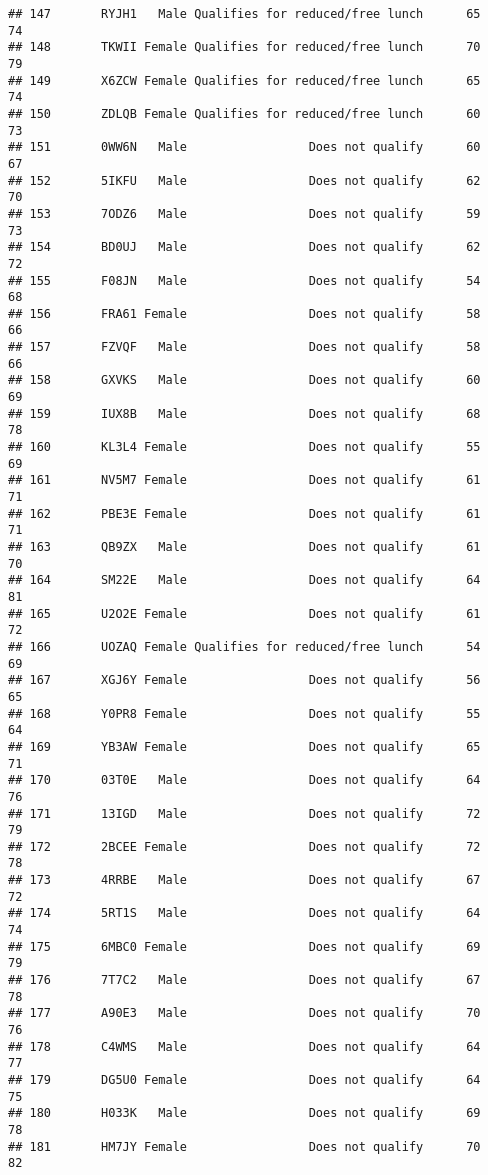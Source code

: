 \documentclass[
]{article}
\begin{document}
\begin{verbatim}
## 147       RYJH1   Male Qualifies for reduced/free lunch      65       74
## 148       TKWII Female Qualifies for reduced/free lunch      70       79
## 149       X6ZCW Female Qualifies for reduced/free lunch      65       74
## 150       ZDLQB Female Qualifies for reduced/free lunch      60       73
## 151       0WW6N   Male                 Does not qualify      60       67
## 152       5IKFU   Male                 Does not qualify      62       70
## 153       7ODZ6   Male                 Does not qualify      59       73
## 154       BD0UJ   Male                 Does not qualify      62       72
## 155       F08JN   Male                 Does not qualify      54       68
## 156       FRA61 Female                 Does not qualify      58       66
## 157       FZVQF   Male                 Does not qualify      58       66
## 158       GXVKS   Male                 Does not qualify      60       69
## 159       IUX8B   Male                 Does not qualify      68       78
## 160       KL3L4 Female                 Does not qualify      55       69
## 161       NV5M7 Female                 Does not qualify      61       71
## 162       PBE3E Female                 Does not qualify      61       71
## 163       QB9ZX   Male                 Does not qualify      61       70
## 164       SM22E   Male                 Does not qualify      64       81
## 165       U2O2E Female                 Does not qualify      61       72
## 166       UOZAQ Female Qualifies for reduced/free lunch      54       69
## 167       XGJ6Y Female                 Does not qualify      56       65
## 168       Y0PR8 Female                 Does not qualify      55       64
## 169       YB3AW Female                 Does not qualify      65       71
## 170       03T0E   Male                 Does not qualify      64       76
## 171       13IGD   Male                 Does not qualify      72       79
## 172       2BCEE Female                 Does not qualify      72       78
## 173       4RRBE   Male                 Does not qualify      67       72
## 174       5RT1S   Male                 Does not qualify      64       74
## 175       6MBC0 Female                 Does not qualify      69       79
## 176       7T7C2   Male                 Does not qualify      67       78
## 177       A90E3   Male                 Does not qualify      70       76
## 178       C4WMS   Male                 Does not qualify      64       77
## 179       DG5U0 Female                 Does not qualify      64       75
## 180       H033K   Male                 Does not qualify      69       78
## 181       HM7JY Female                 Does not qualify      70       82

\end{verbatim}
\end{document}
